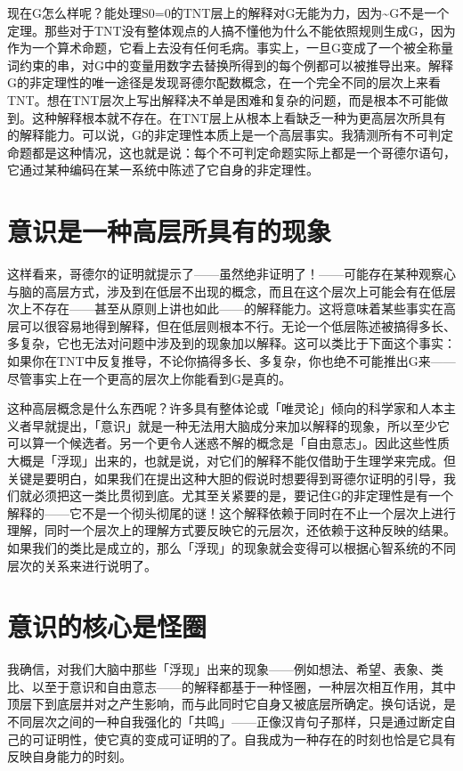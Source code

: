 \documentclass[
  12pt,
  twoside,
  openright,
  oldfontcommands,
]{memoir}
\begin{document}
现在G怎么样呢？能处理S0=0的TNT层上的解释对G无能为力，因为\textasciitilde G不是一个定理。那些对于TNT没有整体观点的人搞不懂他为什么不能依照规则生成G，因为作为一个算术命题，它看上去没有任何毛病。事实上，一旦G变成了一个被全称量词约束的串，对G中的变量用数字去替换所得到的每个例都可以被推导出来。解释G的非定理性的唯一途径是发现哥德尔配数概念，在一个完全不同的层次上来看TNT。想在TNT层次上写出解释决不单是困难和复杂的问题，而是根本不可能做到。这种解释根本就不存在。在TNT层上从根本上看缺乏一种为更高层次所具有的解释能力。可以说，G的非定理性本质上是一个高层事实。我猜测所有不可判定命题都是这种情况，这也就是说：每个不可判定命题实际上都是一个哥德尔语句，它通过某种编码在某一系统中陈述了它自身的非定理性。

\section{意识是一种高层所具有的现象}

这样看来，哥德尔的证明就提示了------虽然绝非证明了！------可能存在某种观察心与脑的高层方式，涉及到在低层不出现的概念，而且在这个层次上可能会有在低层次上不存在------甚至从原则上讲也如此------的解释能力。这将意味着某些事实在高层可以很容易地得到解释，但在低层则根本不行。无论一个低层陈述被搞得多长、多复杂，它也无法对问题中涉及到的现象加以解释。这可以类比于下面这个事实：如果你在TNT中反复推导，不论你搞得多长、多复杂，你也绝不可能推出G来------尽管事实上在一个更高的层次上你能看到G是真的。

这种高层概念是什么东西呢？许多具有整体论或「唯灵论」倾向的科学家和人本主义者早就提出，「意识」就是一种无法用大脑成分来加以解释的现象，所以至少它可以算一个候选者。另一个更令人迷惑不解的概念是「自由意志」。因此这些性质大概是「浮现」出来的，也就是说，对它们的解释不能仅借助于生理学来完成。但关键是要明白，如果我们在提出这种大胆的假说时想要得到哥德尔证明的引导，我们就必须把这一类比贯彻到底。尤其至关紧要的是，要记住G的非定理性是有一个解释的------它不是一个彻头彻尾的谜！这个解释依赖于同时在不止一个层次上进行理解，同时一个层次上的理解方式要反映它的元层次，还依赖于这种反映的结果。如果我们的类比是成立的，那么「浮现」的现象就会变得可以根据心智系统的不同层次的关系来进行说明了。

\section{意识的核心是怪圈}

我确信，对我们大脑中那些「浮现」出来的现象------例如想法、希望、表象、类比、以至于意识和自由意志------的解释都基于一种怪圈，一种层次相互作用，其中顶层下到底层并对之产生影响，而与此同时它自身又被底层所确定。换句话说，是不同层次之间的一种自我强化的「共鸣」------正像汉肯句子那样，只是通过断定自己的可证明性，使它真的变成可证明的了。自我成为一种存在的时刻也恰是它具有反映自身能力的时刻。
\end{document}
